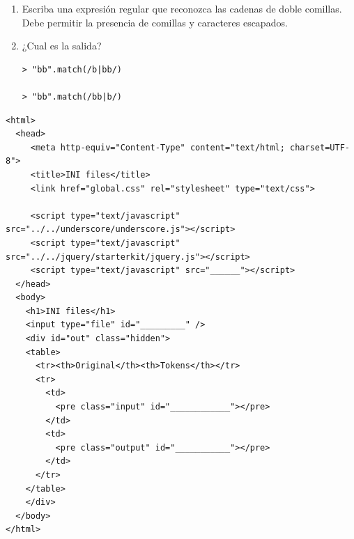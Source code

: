 \begin{enumerate}
\item 
Escriba una expresión regular que reconozca las cadenas de doble comillas.
Debe permitir la presencia de comillas y caracteres escapados.
\item 
¿Cual es la salida?
\begin{verbatim}
> "bb".match(/b|bb/)

> "bb".match(/bb|b/)

\end{verbatim}

\end{enumerate}



\begin{verbatim}
<html>
  <head>
     <meta http-equiv="Content-Type" content="text/html; charset=UTF-8">
     <title>INI files</title>
     <link href="global.css" rel="stylesheet" type="text/css">

     <script type="text/javascript" src="../../underscore/underscore.js"></script>
     <script type="text/javascript" src="../../jquery/starterkit/jquery.js"></script>
     <script type="text/javascript" src="______"></script>
  </head>
  <body>
    <h1>INI files</h1>
    <input type="file" id="_________" />
    <div id="out" class="hidden">
    <table>
      <tr><th>Original</th><th>Tokens</th></tr>
      <tr>
        <td>
          <pre class="input" id="____________"></pre>
        </td>
        <td>
          <pre class="output" id="___________"></pre>
        </td>
      </tr>
    </table>
    </div>
  </body>
</html>
\end{verbatim}


